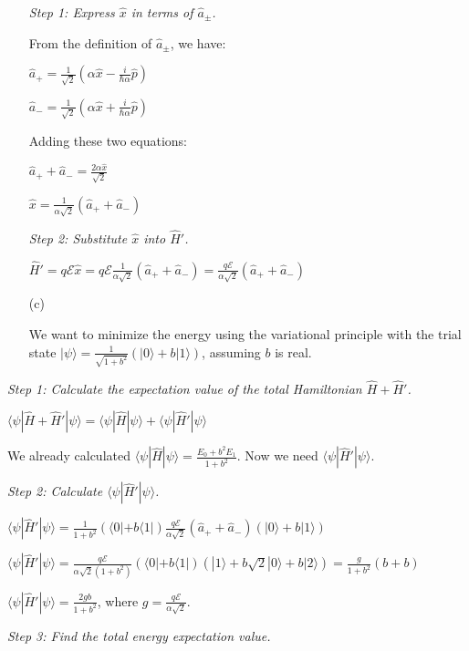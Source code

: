 \documentclass{article}
\begin{document}
\begin{enumerate}
\textit{Step 1: Express $\hat{x}$ in terms of $\hat{a}_\pm$.}

From the definition of $\hat{a}_\pm$, we have:

$\hat{a}_+ = \frac{1}{\sqrt{2}} \left(\alpha \hat{x} - \frac{i}{\hbar \alpha} \hat{p}\right)$

$\hat{a}_- = \frac{1}{\sqrt{2}} \left(\alpha \hat{x} + \frac{i}{\hbar \alpha} \hat{p}\right)$

Adding these two equations:

$\hat{a}_+ + \hat{a}_- = \frac{2\alpha \hat{x}}{\sqrt{2}}$

$\hat{x} = \frac{1}{\alpha\sqrt{2}}(\hat{a}_+ + \hat{a}_-)$

\textit{Step 2: Substitute $\hat{x}$ into $\hat{H}'$.}

$\hat{H}' = q\mathcal{E}\hat{x} = q\mathcal{E}\frac{1}{\alpha\sqrt{2}}(\hat{a}_+ + \hat{a}_-) = \frac{q\mathcal{E}}{\alpha\sqrt{2}}(\hat{a}_+ + \hat{a}_-)$

\item[(c)]

We want to minimize the energy using the variational principle with the trial state $|\psi\rangle = \frac{1}{\sqrt{1+b^2}} (|0\rangle + b|1\rangle)$, assuming $b$ is real.

\end{enumerate}

\textit{Step 1: Calculate the expectation value of the total Hamiltonian $\hat{H} + \hat{H}'$.}

$\langle\psi|\hat{H} + \hat{H}'|\psi\rangle = \langle\psi|\hat{H}|\psi\rangle + \langle\psi|\hat{H}'|\psi\rangle$

We already calculated $\langle\psi|\hat{H}|\psi\rangle = \frac{E_0 + b^2E_1}{1+b^2}$. Now we need $\langle\psi|\hat{H}'|\psi\rangle$.

\textit{Step 2: Calculate $\langle\psi|\hat{H}'|\psi\rangle$.}

$\langle\psi|\hat{H}'|\psi\rangle = \frac{1}{1+b^2} (\langle 0| + b\langle 1|)\frac{q\mathcal{E}}{\alpha\sqrt{2}}(\hat{a}_+ + \hat{a}_-)(|0\rangle + b|1\rangle)$

$\langle\psi|\hat{H}'|\psi\rangle = \frac{q\mathcal{E}}{\alpha\sqrt{2}(1+b^2)}(\langle 0| + b\langle 1|)(|1\rangle + b\sqrt{2}|0\rangle + b|2\rangle) = \frac{g}{1+b^2}(b + b)$

$\langle\psi|\hat{H}'|\psi\rangle = \frac{2gb}{1+b^2}$, where $g = \frac{q\mathcal{E}}{\alpha\sqrt{2}}$.

\textit{Step 3: Find the total energy expectation value.}
\end{document}
